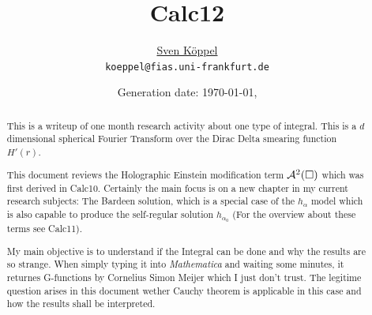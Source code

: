\documentclass[10pt,a4paper, fleqn]{article}
\title{\vspace{-9ex} Calc12 \vspace{-1ex}} %
\author{\small %
\href{https://itp.uni-frankfurt.de/~koeppel}{Sven Köppel} \\
\small \texttt{koeppel@fias.uni-frankfurt.de}}
\date{\small Generation date: \today, \currenttime}
\begin{document}
\maketitle

\renewcommand{\d}{\mathrm{d}}
\newcommand{\dd}[2]{\frac{\mathrm{d} #1}{\mathrm{d} #2}}
\newcommand{\pp}[2]{\frac{\partial #1}{\partial #2}}
\renewcommand{\L}{L_P}
\newcommand{\pr}{p_r}
\newcommand{\psenk}{p_\perp}
\newcommand{\ebenso}{\biggl( ~ \therefore ~ \biggr) }
\newcommand{\metrik}[1]{\d s^2 = \left( #1 \right) \d t^2 \left( #1 \right)^{-1} \d r^2 + r^2 \d \Omega_{D-2}^2 }
\newcommand{\winkel}{r^2 \d \Omega^2}
\newcommand{\dann}{$\rightarrow~$}
\newcommand{\CA}{ {\cal A}}
\newcommand{\C}[1]{ {\cal #1}}
\newcommand{\mn}{_{\mu\nu}}

\newcommand*{\mathcolor}{}
\def\mathcolor#1#{\mathcoloraux{#1}}
\newcommand*{\mathcoloraux}[3]{%
  \protect\leavevmode
  \begingroup
    \color#1{#2}#3%
  \endgroup
}
\newcommand{\redmin}{\mathcolor{red}{-}}
\newcommand{\redplus}{\mathcolor{red}{+}}

\begin{multicols}{2}
\begin{abstract}
This is a writeup of one month research activity about
one type of integral. This is a $d$ dimensional
spherical Fourier Transform over the Dirac Delta smearing
function $H'(r)$.

This document reviews the Holographic Einstein modification
term $\C A^2(\square)$ which was first derived in Calc10.
Certainly the main focus is on a new chapter in my
current research subjects: The Bardeen solution, which is
a special case of the $h_\alpha$ model which is also capable
to produce the self-regular solution $h_{\alpha_0}$ (For
the overview about these terms see Calc11).

My main objective is to understand if the Integral can be
done and why the results are so strange. When simply
typing it into {\it Mathematica} and waiting some minutes,
it returnes G-functions by Cornelius Simon Meijer which I
just don't trust. The legitime question arises in this
document wether Cauchy theorem is applicable in this case
and how the results shall be interpreted.
\end{abstract}
\vfill
\columnbreak
\tableofcontents
\end{multicols}
\end{document}
